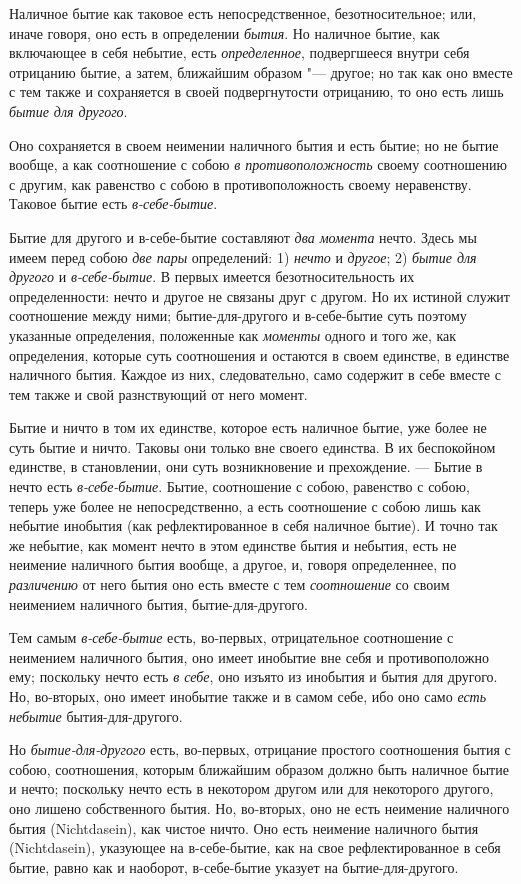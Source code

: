 Наличное бытие как таковое есть непосредственное, безотносительное; или,
иначе говоря, оно есть в определении {\em бытия}. Но
наличное бытие, как включающее в себя небытие, есть
{\em определенное}, подвергшееся внутри себя отрицанию
бытие, а затем, ближайшим образом "--- другое; но так как оно вместе с тем
также и сохраняется в своей подвергнутости отрицанию, то оно есть лишь
{\em бытие для другого}.

Оно сохраняется в своем неимении наличного бытия и есть бытие; но не бытие
вообще, а как соотношение с собою {\em в
противоположность} своему соотношению с другим, как равенство с собою в
противоположность своему неравенству. Таковое бытие есть
{\em в-себе-бытие}.

Бытие для другого и в-себе-бытие составляют {\em два
момента} нечто. Здесь мы имеем перед собою {\em две
пары} определений: 1) {\em нечто} и
{\em другое}; 2) {\em бытие для
другого} и {\em в-себе-бытие}. В первых имеется
безотносительность их определенности: нечто и другое не связаны друг с
другом. Но их истиной служит соотношение между ними; бытие-для-другого и
в-себе-бытие суть поэтому указанные определения, положенные как
{\em моменты} одного и того же, как определения,
которые суть соотношения и остаются в своем единстве, в единстве наличного
бытия. Каждое из них, следовательно, само содержит в себе вместе с тем
также и свой разнствующий от него момент.

Бытие и ничто в том их единстве, которое есть наличное бытие, уже более не
суть бытие и ничто. Таковы они только вне своего единства. В их беспокойном
единстве, в становлении, они суть возникновение и прехождение. — Бытие в
нечто есть {\em в-себе-бытие}. Бытие, соотношение с
собою, равенство с собою, теперь уже более не непосредственно, а есть
соотношение с собою лишь как небытие инобытия (как рефлектированное в себя
наличное бытие). И точно так же небытие, как момент нечто в этом единстве
бытия и небытия, есть не неимение наличного бытия вообще, а другое, и,
говоря определеннее, по {\em различению} от него бытия
оно есть вместе с тем {\em соотношение} со своим
неимением наличного бытия, бытие-для-другого.

Тем самым {\em в-себе-бытие} есть, во-первых,
отрицательное соотношение с неимением наличного бытия, оно имеет инобытие
вне себя и противоположно ему; поскольку нечто есть
{\em в себе}, оно изъято из инобытия и бытия для
другого. Но, во-вторых, оно имеет инобытие также и в самом себе, ибо оно
само {\em есть небытие} бытия-для-другого.

Но {\em бытие-для-другого} есть, во-первых, отрицание
простого соотношения бытия с собою, соотношения, которым ближайшим образом
должно быть наличное бытие и нечто; поскольку нечто есть в некотором другом
или для некоторого другого, оно лишено собственного бытия. Но, во-вторых,
оно не есть неимение наличного бытия (Nichtdasein), как чистое ничто. Оно
есть неимение наличного бытия (Nichtdasein), указующее на в-себе-бытие, как
на свое рефлектированное в себя бытие, равно как и наоборот, в-себе-бытие
указует на бытие-для-другого.

